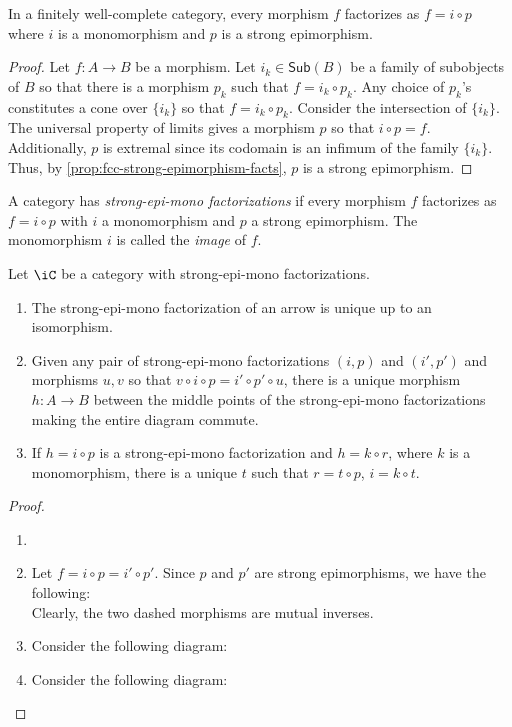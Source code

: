 \documentclass{amsart}
\begin{document}
\begin{prop}
  In a finitely well-complete category, every morphism $f$ factorizes as $f = i \circ p$ where $i$ is a monomorphism and $p$ is a strong epimorphism.
\end{prop}
\begin{proof}
  Let $f : A \to B$ be a morphism.
  Let $i_{k} \in \mathsf{Sub}(B)$ be a family of subobjects of $B$ so that there is a morphism $p_{k}$ such that $f = i_{k} \circ p_{k}$.
  Any choice of $p_{k}$'s constitutes a cone over $\{i_{k}\}$ so that $f = i_{k} \circ p_{k}$.
  Consider the intersection of $\{i_{k}\}$.
  The universal property of limits gives a morphism $p$ so that $i \circ p = f$.
  \[\]
  Additionally, $p$ is extremal since its codomain is an infimum of the family $\{i_{k}\}$.
  Thus, by \cref{prop:fcc-strong-epimorphism-facts}, $p$ is a strong epimorphism.
\end{proof}

\begin{defn}
  A category has \emph{strong-epi-mono factorizations} if every morphism $f$ factorizes as $f = i \circ p$ with $i$ a monomorphism and $p$ a strong epimorphism.
  The monomorphism $i$ is called the \emph{image} of $f$.
\end{defn}

\begin{prop}\label{prop:semf-facts}
  Let $\iC$ be a category with strong-epi-mono factorizations.
  \begin{enumerate}
  \item The strong-epi-mono factorization of an arrow is unique up to an isomorphism.
  \item Given any pair of strong-epi-mono factorizations $(i,p)$ and $(i',p')$ and morphisms $u, v$ so that $v \circ i \circ p = i' \circ p' \circ u$, there is a unique morphism $h : A \to B$ between the middle points of the strong-epi-mono factorizations making the entire diagram commute.
  \item If $h = i \circ p$ is a strong-epi-mono factorization and $h = k \circ r$, where $k$ is a monomorphism, there is a unique $t$ such that $r = t \circ p$, $i = k \circ t$.
  \end{enumerate}
\end{prop}
\begin{proof}
  \begin{enumerate}
  \item[]
  \item Let $f = i \circ p = i' \circ p'$.
    Since $p$ and $p'$ are strong epimorphisms, we have the following:
    \[\]
    Clearly, the two dashed morphisms are mutual inverses.
  \item Consider the following diagram:
    \[\]
  \item Consider the following diagram:
    \[\]
  \end{enumerate}
\end{proof}
\end{document}
